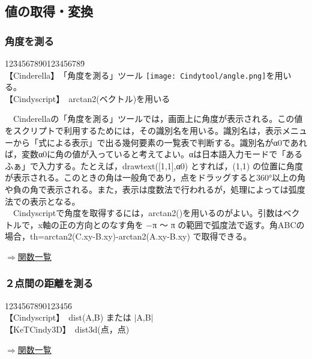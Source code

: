 \documentclass[papersize,a4paper,12pt,uplatex]{jsarticle}
\begin{document}
\subsection{値の取得・変換}
\subsubsection{角度を測る}

\begin{tabbing}
12\=34567890123456789\=\kill\\

\>【Cinderella】　\>「角度を測る」ツール \texttt{[image: Cindytool/angle.png]}を用いる。\\ 
\>【Cindyscript】　\>arctan2(ベクトル)を用いる\\
\end{tabbing}
　Cinderellaの「角度を測る」ツールでは，画面上に角度が表示される。この値をスクリプトで利用するためには，その識別名を用いる。識別名は，表示メニューから「式による表示」で出る幾何要素の一覧表で判断する。識別名がα0であれば，変数α0に角の値が入っていると考えてよい。αは日本語入力モードで「あるふぁ」で入力する。たとえば，drawtext([1,1],α0) とすれば，(1,1) の位置に角度が表示される。このときの角は一般角であり，点をドラッグすると360°以上の角や負の角で表示される。また，表示は度数法で行われるが，処理によっては弧度法での表示となる。\\
　Cindyscriptで角度を取得するには，arctan2()を用いるのがよい。引数はベクトルで，x軸の正の方向とのなす角を −π 〜 π の範囲で弧度法で返す。角ABCの場合，th=arctan2(C.xy-B.xy)-arctan2(A.xy-B.xy) で取得できる。\\
\begin{flushright} \hyperlink{functionlist3d}{$\Rightarrow$関数一覧}\end{flushright}

\subsubsection{２点間の距離を測る}

\begin{tabbing}
12\=34567890123456\=\kill\\

\>【Cindyscript】　\>dist(A,B) または $|$A,B$|$　\\
 \>【KeTCindy3D】　\>dist3d(点，点)\\
\end{tabbing}
\begin{flushright} \hyperlink{functionlist3d}{$\Rightarrow$関数一覧}\end{flushright}
\end{document}
